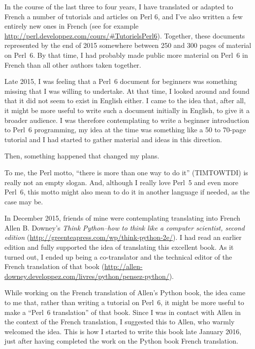 In the course of the last three to four years, I  
have translated or adapted to French a number of tutorials 
and articles on Perl 6, and I've also written a few entirely 
new ones in French (see for example 
\url{http://perl.developpez.com/cours/#TutorielsPerl6}). 
Together, these documents represented by the end of 2015 
somewhere between 250 and 300 pages of material on Perl~6. 
By that time, I had 
probably made public more material on Perl~6 in French than 
all other authors taken together.

Late 2015, I was feeling that a Perl~6 document for beginners 
was something missing that I was willing to undertake. At that 
time, I looked around and found that it did not seem to 
exist in English either. I came to the idea that, after all, 
it might be more useful to write such a document initially 
in English, to give it a broader audience. I was therefore 
contemplating to write a beginner introduction to Perl~6 
programming, my idea at the time was something like a 50 to 
70-page tutorial and I had started to gather material and ideas 
in this direction.

Then, something happened that changed my plans.

To me, the Perl motto, ``there is more than one way to 
do it'' (TIMTOWTDI) is really not an empty slogan. And, although 
I really love Perl~5 and even more Perl~6, this motto might 
also mean to do it in another language if needed, as the 
case may be.

In December 2015, friends of mine were contemplating translating 
into French Allen B. Downey's \emph{Think Python--how to think 
like a computer scientist, second edition} 
(\url{http://greenteapress.com/wp/think-python-2e/}). I had 
read an earlier edition and fully supported 
the idea of translating this excellent book. As it turned out, 
I ended up being a co-translator and the technical editor of 
the French translation of that book (\url{http://allen-downey.developpez.com/livres/python/pensez-python/}).

While working on the French translation of Allen's Python book, 
the idea came to me that, rather than writing a tutorial on 
Perl~6, it might be more useful to make a ``Perl~6 translation'' 
of that book. Since I was in contact with Allen in the context 
of the French translation, I suggested this to Allen, who 
warmly welcomed the idea. This is how I started to write this 
book late January 2016, just after having completed the 
work on the Python book French translation.

